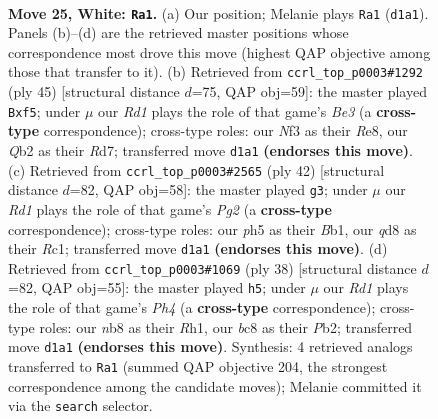 \documentclass[11pt]{article}
\begin{document}
\clearpage

\begin{figure}[p]\centering
\begin{subfigure}{0.46\textwidth}\centering
\resizebox{\linewidth}{!}{%
\newchessgame
\chessboard[
  setfen={rnbqr2k/5p2/1p2pnp1/7p/p1PP4/B2B1NPP/PQ2RP2/3R2K1 w - - 5 25},
  showmover=false,
  pgfstyle=straightmove, color=movearrow, markmove={d1-a1}
]}
\caption{}
\end{subfigure}\hfill
\begin{subfigure}{0.46\textwidth}\centering
\resizebox{\linewidth}{!}{%
\newchessgame
\chessboard[
  setfen={4r1k1/2prq1pp/1n2b3/2p1pP2/p7/P2P1PP1/1PQN3P/2N1RR1K b - - 0 23},
  showmover=false,
  pgfstyle=straightmove, color=movearrow, markmove={e6-f5}
]}
\caption{}
\end{subfigure}
\\[4pt]
\begin{subfigure}{0.46\textwidth}\centering
\resizebox{\linewidth}{!}{%
\newchessgame
\chessboard[
  setfen={2rqr1k1/5pb1/1p2pnpp/p7/2PP3P/P4Q2/1B3PP1/1BR1R1K1 w - - 1 22},
  showmover=false,
  pgfstyle=straightmove, color=movearrow, markmove={g2-g3}
]}
\caption{}
\end{subfigure}\hfill
\begin{subfigure}{0.46\textwidth}\centering
\resizebox{\linewidth}{!}{%
\newchessgame
\chessboard[
  setfen={2b1k2r/r4pp1/nq1p3p/pp1Pp3/6PP/PN1BPQ2/1PP1K3/R6R w k - 4 20},
  showmover=false,
  pgfstyle=straightmove, color=movearrow, markmove={h4-h5}
]}
\caption{}
\end{subfigure}
\caption{\textbf{Move 25, White: \texttt{Ra1}.} (a) Our position; Melanie plays \texttt{Ra1} (\texttt{d1a1}). Panels (b)--(d) are the retrieved master positions whose correspondence most drove this move (highest QAP objective among those that transfer to it). (b) Retrieved from \texttt{ccrl\_top\_p0003\#1292} (ply 45) [structural distance $d$=75, QAP obj=59]: the master played \texttt{Bxf5}; under $\mu$ our \emph{Rd1} plays the role of that game's \emph{Be3} (a \textbf{cross-type} correspondence); cross-type roles: our \emph{N}f3 as their \emph{R}e8, our \emph{Q}b2 as their \emph{R}d7; transferred move \texttt{d1a1} \textbf{(endorses this move)}. (c) Retrieved from \texttt{ccrl\_top\_p0003\#2565} (ply 42) [structural distance $d$=82, QAP obj=58]: the master played \texttt{g3}; under $\mu$ our \emph{Rd1} plays the role of that game's \emph{Pg2} (a \textbf{cross-type} correspondence); cross-type roles: our \emph{p}h5 as their \emph{B}b1, our \emph{q}d8 as their \emph{R}c1; transferred move \texttt{d1a1} \textbf{(endorses this move)}. (d) Retrieved from \texttt{ccrl\_top\_p0003\#1069} (ply 38) [structural distance $d$=82, QAP obj=55]: the master played \texttt{h5}; under $\mu$ our \emph{Rd1} plays the role of that game's \emph{Ph4} (a \textbf{cross-type} correspondence); cross-type roles: our \emph{n}b8 as their \emph{R}h1, our \emph{b}c8 as their \emph{P}b2; transferred move \texttt{d1a1} \textbf{(endorses this move)}. Synthesis: 4 retrieved analogs transferred to \texttt{Ra1} (summed QAP objective 204, the strongest correspondence among the candidate moves); Melanie committed it via the \texttt{search} selector.}
\label{fig:thought-m48}
\end{figure}
\end{document}
